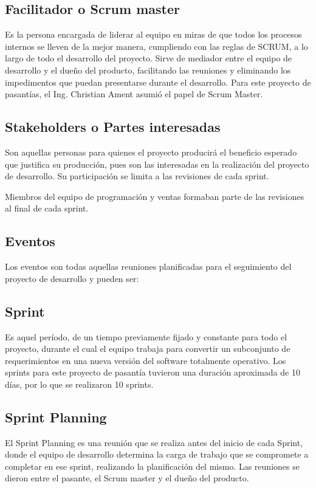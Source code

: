 \subsection{Facilitador o Scrum master}
Es la persona encargada de liderar al equipo en miras de que todos los procesos internos se lleven de la mejor manera, cumpliendo con las reglas de SCRUM, a lo largo de todo el desarrollo del proyecto. Sirve de mediador entre el equipo de desarrollo y el dueño del producto, facilitando las reuniones y eliminando los impedimentos que puedan presentarse durante el desarrollo.
Para este proyecto de pasantías, el Ing. Christian Ament asumió el papel de Scrum Master.

\subsection{Stakeholders o Partes interesadas}
Son aquellas personas para quienes el proyecto producirá el beneficio esperado que justifica su producción, pues son las interesadas en la realización del proyecto de desarrollo. Su participación se limita a las revisiones de cada sprint.

Miembros del equipo de programación y ventas formaban parte de las revisiones al final de cada sprint.

\subsection{Eventos}
Los eventos son todas aquellas reuniones planificadas para el seguimiento del proyecto de desarrollo y pueden ser:

\subsection{Sprint}
Es aquel período, de un tiempo previamente fijado y constante para todo el proyecto, durante el cual el equipo trabaja para convertir un subconjunto de requerimientos en una nueva versión del software totalmente operativo. Los sprints para este proyecto de pasantía tuvieron una duración aproximada de 10 días, por lo que se realizaron 10 sprints.

\subsection{Sprint Planning}
El Sprint Planning es una reunión que se realiza antes del inicio de cada Sprint, donde el equipo de desarrollo determina la carga de trabajo que se compromete a completar en ese sprint, realizando la planificación del mismo. Las reuniones se dieron entre el pasante, el Scrum master y el dueño del producto.

